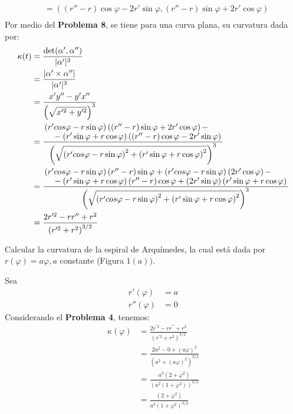 \begin{problema}
\begin{sol}
\begin{itemize}
\begin{align*}
            &= \left((r''-r)\cos \varphi -2r'\sin\varphi, (r''-r)\sin\varphi +2r'\cos\varphi \right)\\
        \end{align*}
        Por medio del \textbf{Problema 8}, se tiene para una curva plana, su curvatura dada por: 
        \begin{align*}
            \kappa(t) &= \frac{\det(\alpha ', \alpha'')}{|\alpha '|^3}\\
                      &= \frac{|\alpha'\times \alpha''|}{|\alpha '|^3}\\
                      &= \frac{x'y''-y'x''}{\left(\sqrt{x'^2+y'^2}\right)^3}\\
                      &= \frac{\splitfrac{\left(r'cos\varphi - r\sin \varphi\right)\left((r''-r)\sin\varphi +2r'\cos\varphi\right)-}{-\left(r'\sin \varphi +r\cos\varphi\right)\left((r''-r)\cos \varphi -2r'\sin\varphi\right)}}{\left(\sqrt{\left(r'cos\varphi - r\sin \varphi\right)^2+\left(r'\sin \varphi +r\cos\varphi\right)^2}\right)^3}\\
                      &= \frac{\splitfrac{\left(r'cos\varphi - r\sin \varphi\right)(r''-r)\sin\varphi + \left(r'cos\varphi - r\sin \varphi\right)\left(2r'\cos\varphi\right)-}{-\left(r'\sin \varphi +r\cos\varphi\right) (r''-r)\cos \varphi +\left( 2r'\sin\varphi\right)\left(r'\sin \varphi +r\cos\varphi\right)}}{\left(\sqrt{\left(r'cos\varphi - r\sin \varphi\right)^2+\left(r'\sin \varphi +r\cos\varphi\right)^2}\right)^3}\\
                      &=\frac{2r'^2 -rr'' +r^2}{\left(r'^2 +r^2\right)^{3/2}}
        \end{align*}
        
    \end{itemize}
\end{sol}

\end{problema}


\begin{problema}
    Calcular la curvatura de la espiral de Arquímedes, la cual está dada por $r(\varphi)=a \varphi, a$ constante (Figura $1(a))$.
    \begin{sol}
        Sea
        \begin{align*}
            r'(\varphi) &= a\\
            r''(\varphi) &= 0
        \end{align*}
        Considerando el \textbf{Problema 4}, tenemos: 
        \begin{align*}
            \kappa(\varphi)&=\frac{2 r^{\prime 2}-r r^{\prime \prime}+r^{2}}{\left(r^{\prime 2}+r^{2}\right)^{3 / 2}}\\
            &= \frac{2a^2-0+(a\varphi)^2}{(a^2+(a\varphi)^2)^{3/2}}\\
            &= \frac{a^2(2+\varphi^2)}{(a^2(1+\varphi^2))^{3/2}}\\
            &= \frac{(2+\varphi^2)}{a^{3}(1+\varphi^2)^{3/2}}\\
        \end{align*}
    \end{sol}
\end{problema}

